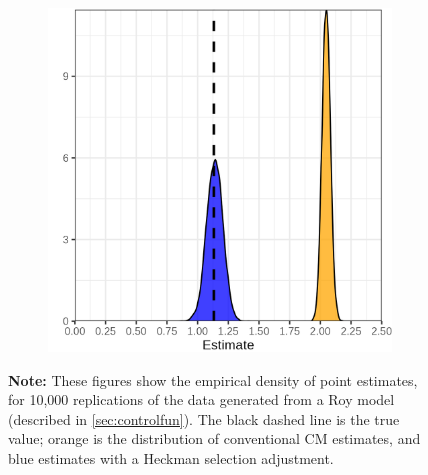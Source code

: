 \begin{figure}[h!]
\begin{subfigure}[c]{0.475\textwidth}
        \includegraphics[width=\textwidth]{
            ../programs/simulations/sim-output/heckit-indirect-dist.png}
    \end{subfigure}
    \label{fig:cm-heckit-dist}
    \justify
    \footnotesize    
    \textbf{Note:}
    These figures show the empirical density of point estimates, for 10,000 replications of the data generated from a Roy model (described in \autoref{sec:controlfun}).
    The black dashed line is the true value;
    orange is the distribution of conventional CM estimates,
    and blue estimates with a Heckman selection adjustment.
\end{figure}
